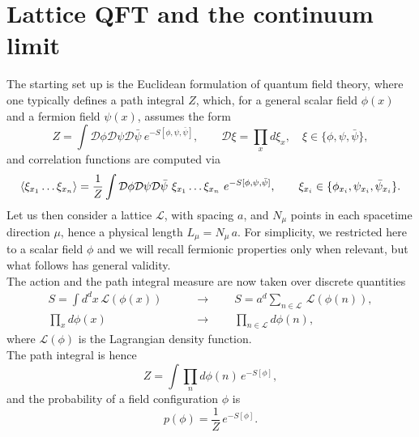 \section{Lattice QFT and the continuum limit}
\label{sec:lattice_continuum_}
The starting set up is the Euclidean formulation of quantum field theory, where one typically defines a path integral $Z$, which, for a general scalar field $\phi(x)$ and a fermion field $\psi(x)$, assumes the form
\begin{equation}
    Z = \int \mathcal{D}\phi\mathcal{D}\psi\mathcal{D}\bar\psi \ e^{-S[\phi, \psi, \bar\psi]}, \qquad \mathcal{D}\xi = \prod_x d\xi_x, \quad \xi \in \{\phi, \psi, \bar\psi\},
    \label{eq:path_integral_generic}
\end{equation}
and correlation functions are computed via
\begin{equation*}
        \left\langle \xi_{x_1} \dots \xi_{x_n}  \right\rangle = \frac{1}{Z} \int \mathcal{D}\phi\mathcal{D}\psi\mathcal{D}\bar\psi \ \xi_{x_1} \dots \xi_{x_n} \ e^{-S[\phi, \psi, \bar\psi]}, \qquad \xi_{x_i} \in \{\phi_{x_i}, \psi_{x_i}, \bar\psi_{x_i}\}. \\
\end{equation*}
Let us then consider a lattice $\mathscr{L}$, with spacing $a$, and $N_\mu$ points in each spacetime direction $\mu$, hence a physical length $L_\mu = N_\mu \, a$.
For simplicity, we restricted here to a scalar field $\phi$ and we will recall fermionic properties only when relevant, but what follows has general validity. \\
The action and the path integral measure are now taken over discrete quantities 
\begin{equation*}
    \begin{aligned}
	    S = \int d^dx \, \mathcal{L}(\phi(x)) \qquad &\to \qquad S = a^d \sum_{n \in \mathscr{L}} \, \mathcal{L}(\phi(n)), \\
        \prod_{x} d\phi(x) \qquad &\to  \qquad \prod_{n \in \mathscr{L}} d\phi(n),
    \end{aligned}
\end{equation*}
where $\mathcal{L}(\phi)$ is the Lagrangian density function.  \\
The path integral is hence
\begin{equation*}
    Z = \int \prod_n d\phi(n) \, e^{-S[\phi]},
\end{equation*}
and the probability of a field configuration $\phi$ is
\begin{equation}
    p(\phi) = \frac{1}{Z} \, e^{-S[\phi]}.
    \label{eq:probability_distribution_lattice}
\end{equation}
